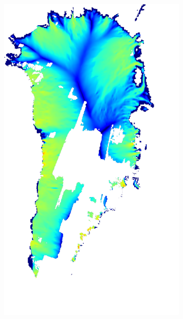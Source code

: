 \documentclass{beamer}
\begin{document}
\begin{frame}
\begin{columns}
\begin{column}{0.33\textwidth}
\end{column}
\begin{column}{0.33\textwidth}
\begin{center}
  \includegraphics[width=0.75\textwidth]{g3km_3_25_98_hotspot}
\end{center}
\end{column}
\begin{column}{0.33\textwidth}
\begin{center}

\end{center}
\end{column}
\end{columns}
\end{frame}
\end{document}
